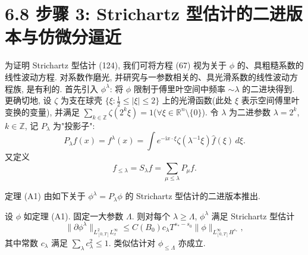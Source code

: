 \setcounter{mtthm}{8}%

\section*{6.8 步骤 3: Strichartz 型估计的二进版本与仿微分逼近}

为证明 Strichartz 型估计 (124), 我们可将方程 (67) 视为关于 $\phi$ 的、具粗糙系数的线性波动方程. 对系数作磨光, 并研究与一参数相关的、具光滑系数的线性波动方程族, 是有利的. 首先引入 $\phi^\lambda$: 将 $\phi$ 限制于傅里叶空间中频率 $\sim\lambda$ 的二进块得到. 更确切地, 设 $\zeta$ 为支在球壳 $\{\xi:\frac12\leq|\xi|\leq 2\}$ 上的光滑函数(此处 $\xi$ 表示空间傅里叶变换的变量), 并满足 $\sum_{k\in\mathbb{Z}}\zeta(2^k\xi)=1$($\forall\xi\in\mathbb{R}^n\setminus\{0\}$). 令 $\lambda$ 为二进参数 $\lambda=2^k$, $k\in\mathbb{Z}$, 记 $P_\lambda$ 为"投影子":
\begin{equation}
P_\lambda f(x)=f^\lambda(x)=\int e^{-\mathrm{i}x\cdot\xi}\zeta(\lambda^{-1}\xi)\hat f(\xi)\,d\xi.\end{equation}
又定义
\begin{equation}
f_{\leq\lambda}=S_\lambda f=\sum_{\mu\leq\lambda}P_\mu f.\end{equation}

定理 (A1) 由如下关于 $\phi^\lambda=P_\lambda\phi$ 的 Strichartz 型估计的二进版本推出.
\begin{theorem}[A2]\label{thm:6.9}
设 $\phi$ 如定理 (A1). 固定一大参数 $\Lambda$. 则对每个 $\lambda\geq\Lambda$, $\phi^\lambda$ 满足 Strichartz 型估计
\begin{equation}
\|\partial\phi^\lambda\|_{L_{[0,T]}^2L_x^\infty}\leq C(B_0)c_\lambda T^{s_*-s_0}\|\phi\|_{L_{[0,T]}^\infty H^{s_*}},\end{equation}
其中常数 $c_\lambda$ 满足 $\sum_\lambda c_\lambda^2\leq 1$. 类似估计对 $\phi_{\leq\Lambda}$ 亦成立.\end{theorem}

